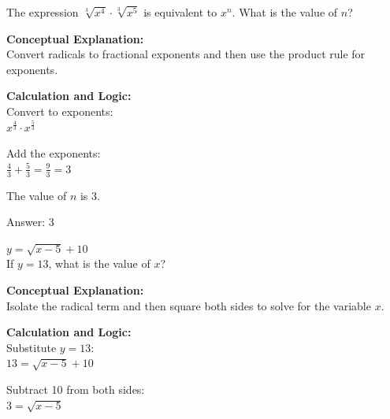 \documentclass[11pt,paper=a4,answers]{exam}
\begin{document}
\begin{questions}
\vspace{40pt}

\question
The expression $\sqrt[3]{x^4} \cdot \sqrt[3]{x^5}$ is equivalent to $x^n$. What is the value of $n$?

\begin{solution}
\textbf{Conceptual Explanation:} \\
Convert radicals to fractional exponents and then use the product rule for exponents.

\vspace{20pt}

\textbf{Calculation and Logic:} \\
Convert to exponents: \\
$x^{\frac{4}{3}} \cdot x^{\frac{5}{3}}$

\vspace{10pt}

Add the exponents: \\
$\frac{4}{3} + \frac{5}{3} = \frac{9}{3} = 3$

\vspace{10pt}

The value of $n$ is 3.

\vspace{25pt}

Answer: \colorbox{yellow!100}{3}
\end{solution}

\vspace{40pt}

\question
$y = \sqrt{x - 5} + 10$ \\
If $y = 13$, what is the value of $x$?

\begin{solution}
\textbf{Conceptual Explanation:} \\
Isolate the radical term and then square both sides to solve for the variable $x$.

\vspace{20pt}

\textbf{Calculation and Logic:} \\
Substitute $y = 13$: \\
$13 = \sqrt{x - 5} + 10$

\vspace{10pt}

Subtract 10 from both sides: \\
$3 = \sqrt{x - 5}$


\end{solution}
\end{questions}
\end{document}
